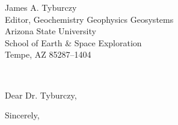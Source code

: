 \documentclass{letter}
\date{}
\makeatletter
\def\opening#1{\ifx\@empty\fromaddress
  \thispagestyle{firstpage}
    {\raggedleft\@date\par}
  \else  %
    \thispagestyle{empty}
    {\noindent\let\\\cr\halign{##\hfil\cr\ignorespaces
      \fromaddress \cr\noalign{\kern 2\parskip}
      \@date\cr}\par}
  \fi
  \vspace{2\parskip}
  {\raggedleft \toname \\ \toaddress \par}%
  \vspace{2\parskip}
  #1\par\nobreak}
\makeatother
\begin{document}
 
\begin{letter}
{James A. Tyburczy \\
Editor, Geochemistry Geophysics Geosystems \\ 
Arizona State University \\
School of Earth \& Space Exploration\\ 
Tempe, AZ 85287–1404}

\opening{Dear Dr. Tyburczy,}

\vspace{1cm}
\closing{Sincerely,}

\end{letter}
\end{document}
